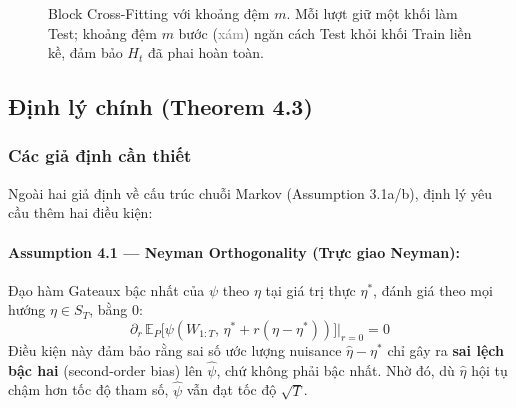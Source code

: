 \begin{figure}[H]
\caption{Block Cross-Fitting với khoảng đệm \(m\). Mỗi lượt giữ một khối làm Test; khoảng đệm \(m\) bước (\textcolor{gray}{xám}) ngăn cách Test khỏi khối Train liền kề, đảm bảo \(H_t\) đã phai hoàn toàn.}
\label{fig:block-crossfit}
\end{figure}

\subsection{Định lý chính (Theorem 4.3)}

\subsubsection{Các giả định cần thiết}

Ngoài hai giả định về cấu trúc chuỗi Markov (Assumption 3.1a/b), định lý yêu cầu thêm hai điều kiện:

\paragraph{Assumption 4.1 --- Neyman Orthogonality (Trực giao Neyman):}
Đạo hàm Gateaux bậc nhất của \(\psi\) theo \(\eta\) tại giá trị thực \(\eta^*\), đánh giá theo mọi hướng \(\eta \in S_T\), bằng 0:
\[
    \partial_r \,\mathbb{E}_P\bigl[\psi(W_{1:T},\, \eta^* + r(\eta - \eta^*))\bigr]\big|_{r=0} = 0
\]
Điều kiện này đảm bảo rằng sai số ước lượng nuisance \(\hat{\eta} - \eta^*\) chỉ gây ra \textbf{sai lệch bậc hai} (second-order bias) lên \(\hat{\psi}\), chứ không phải bậc nhất. Nhờ đó, dù \(\hat{\eta}\) hội tụ chậm hơn tốc độ tham số, \(\hat{\psi}\) vẫn đạt tốc độ \(\sqrt{T}\).


